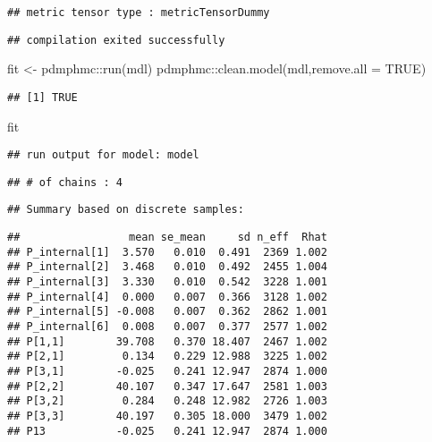 \documentclass[
]{book}
\newenvironment{Shaded}{\begin{snugshade}}{\end{snugshade}}
\newcommand{\AttributeTok}[1]{\textcolor[rgb]{0.77,0.63,0.00}{#1}}
\newcommand{\ConstantTok}[1]{\textcolor[rgb]{0.00,0.00,0.00}{#1}}
\newcommand{\FunctionTok}[1]{\textcolor[rgb]{0.00,0.00,0.00}{#1}}
\newcommand{\NormalTok}[1]{#1}
\newcommand{\OtherTok}[1]{\textcolor[rgb]{0.56,0.35,0.01}{#1}}
\newcommand{\SpecialCharTok}[1]{\textcolor[rgb]{0.00,0.00,0.00}{#1}}
\begin{document}
\begin{verbatim}
## metric tensor type : metricTensorDummy
\end{verbatim}

\begin{verbatim}
## compilation exited successfully
\end{verbatim}

\begin{Shaded}
\begin{Highlighting}[]
\NormalTok{fit }\OtherTok{\textless{}{-}}\NormalTok{ pdmphmc}\SpecialCharTok{::}\FunctionTok{run}\NormalTok{(mdl)}
\NormalTok{pdmphmc}\SpecialCharTok{::}\FunctionTok{clean.model}\NormalTok{(mdl,}\AttributeTok{remove.all =} \ConstantTok{TRUE}\NormalTok{)}
\end{Highlighting}
\end{Shaded}

\begin{verbatim}
## [1] TRUE
\end{verbatim}

\begin{Shaded}
\begin{Highlighting}[]
\NormalTok{fit}
\end{Highlighting}
\end{Shaded}

\begin{verbatim}
## run output for model: model
\end{verbatim}

\begin{verbatim}
## # of chains : 4
\end{verbatim}

\begin{verbatim}
## Summary based on discrete samples:
\end{verbatim}

\begin{verbatim}
##                 mean se_mean     sd n_eff  Rhat
## P_internal[1]  3.570   0.010  0.491  2369 1.002
## P_internal[2]  3.468   0.010  0.492  2455 1.004
## P_internal[3]  3.330   0.010  0.542  3228 1.001
## P_internal[4]  0.000   0.007  0.366  3128 1.002
## P_internal[5] -0.008   0.007  0.362  2862 1.001
## P_internal[6]  0.008   0.007  0.377  2577 1.002
## P[1,1]        39.708   0.370 18.407  2467 1.002
## P[2,1]         0.134   0.229 12.988  3225 1.002
## P[3,1]        -0.025   0.241 12.947  2874 1.000
## P[2,2]        40.107   0.347 17.647  2581 1.003
## P[3,2]         0.284   0.248 12.982  2726 1.003
## P[3,3]        40.197   0.305 18.000  3479 1.002
## P13           -0.025   0.241 12.947  2874 1.000
\end{verbatim}
\end{document}
